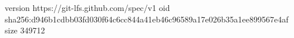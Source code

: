 version https://git-lfs.github.com/spec/v1
oid sha256:d946b1cdbb03fd030f64c6cc844a41eb46c96589a17e026b35a1ee899567e4af
size 349712
